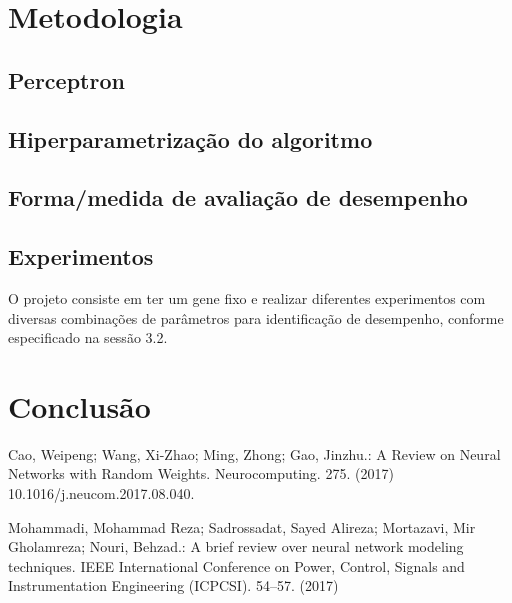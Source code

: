 \documentclass[runningheads]{llncs}
\begin{document}
\section{Metodologia}

\subsection{Perceptron}

\subsection{Hiperparametrização do algoritmo}


\subsection{Forma/medida de avaliação de desempenho}

\subsection{Experimentos}


O projeto consiste em ter um gene fixo e realizar diferentes experimentos com diversas combinações de parâmetros para identificação de desempenho, conforme especificado na sessão 3.2. 


\section{Conclusão}

%
%
%
% 
% 
%

\begin{thebibliography}{8}
Cao, Weipeng; Wang, Xi-Zhao; Ming, Zhong; Gao, Jinzhu.: A Review on Neural Networks with Random Weights. Neurocomputing. 275. (2017) 10.1016/j.neucom.2017.08.040. 

Mohammadi, Mohammad Reza; Sadrossadat, Sayed Alireza; Mortazavi, Mir Gholamreza; Nouri, Behzad.: A brief review over neural network modeling techniques. IEEE International Conference on Power, Control, Signals and Instrumentation Engineering (ICPCSI). 54--57. (2017)


\end{thebibliography}
\end{document}
